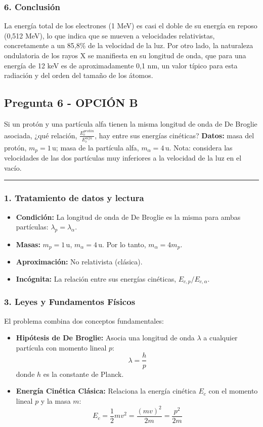 \subsubsection*{6. Conclusión}
\begin{cajaconclusion}
La energía total de los electrones (1 MeV) es casi el doble de su energía en reposo (0,512 MeV), lo que indica que se mueven a velocidades relativistas, concretamente a un 85,8\% de la velocidad de la luz. Por otro lado, la naturaleza ondulatoria de los rayos X se manifiesta en su longitud de onda, que para una energía de 12 keV es de aproximadamente 0,1 nm, un valor típico para esta radiación y del orden del tamaño de los átomos.
\end{cajaconclusion}

\newpage
\subsection{Pregunta 6 - OPCIÓN B}
\label{subsec:6B_2016_jul_ext}
\begin{cajaenunciado}
Si un protón y una partícula alfa tienen la misma longitud de onda de De Broglie asociada, ¿qué relación, $\frac{E_c^{protón}}{E_c^{alfa}}$, hay entre sus energías cinéticas?
\textbf{Datos:} masa del protón, $m_p=1\,\text{u}$; masa de la partícula alfa, $m_\alpha=4\,\text{u}$.
Nota: considera las velocidades de las dos partículas muy inferiores a la velocidad de la luz en el vacío.
\end{cajaenunciado}
\hrule

\subsubsection*{1. Tratamiento de datos y lectura}
\begin{itemize}
    \item \textbf{Condición:} La longitud de onda de De Broglie es la misma para ambas partículas: $\lambda_p = \lambda_\alpha$.
    \item \textbf{Masas:} $m_p = 1\,\text{u}$, $m_\alpha = 4\,\text{u}$. Por lo tanto, $m_\alpha = 4m_p$.
    \item \textbf{Aproximación:} No relativista (clásica).
    \item \textbf{Incógnita:} La relación entre sus energías cinéticas, $E_{c,p} / E_{c,\alpha}$.
\end{itemize}

\subsubsection*{3. Leyes y Fundamentos Físicos}
El problema combina dos conceptos fundamentales:
\begin{itemize}
    \item \textbf{Hipótesis de De Broglie:} Asocia una longitud de onda $\lambda$ a cualquier partícula con momento lineal $p$:
    $$ \lambda = \frac{h}{p} $$
    donde $h$ es la constante de Planck.
    \item \textbf{Energía Cinética Clásica:} Relaciona la energía cinética $E_c$ con el momento lineal $p$ y la masa $m$:
    $$ E_c = \frac{1}{2}mv^2 = \frac{(mv)^2}{2m} = \frac{p^2}{2m} $$
\end{itemize}

